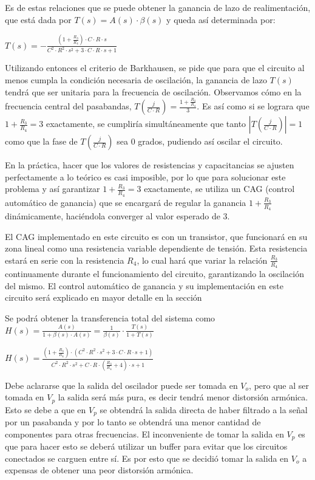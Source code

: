 \documentclass[../../tc_tp6_main.tex]{subfiles}
\begin{document}
	 Es de estas relaciones que se puede obtener la ganancia de lazo de realimentación, que está dada por $T(s) = A(s)\cdot \beta(s)$ y queda así determinada por: \par
	 \begin{center}
	 $T(s) =-\frac{(1+\frac{R_3}{R_4} )\cdot C\cdot R \cdot s}{C^2\cdot R^2 \cdot s^2 + 3\cdot C\cdot R\cdot s +1}$ 
	\end{center}
	Utilizando entonces el criterio de Barkhausen, se pide que para que el circuito al menos cumpla la condición necesaria de oscilación, la ganancia de lazo $T(s)$ tendrá que ser unitaria para la frecuencia de oscilación. Observamos cómo en la frecuencia central del pasabandas, $T(\frac{j}{C\cdot R}) = \frac{1+\frac{R_3}{R_4}}{3}$. Es así como si se lograra que $1+\frac{R_3}{R_4} = 3$ exactamente, se cumpliría simultáneamente que tanto $|T(\frac{j}{C\cdot R})| = 1$ como que la fase de $T(\frac{j}{C\cdot R})$ sea 0 grados, pudiendo así oscilar el circuito. \par
	En la práctica, hacer que los valores de resistencias y capacitancias se ajusten perfectamente a lo teórico es casi imposible, por lo que para solucionar este problema y así garantizar $1+\frac{R_3}{R_4} = 3$ exactamente, se utiliza un CAG (control automático de ganancia) que se encargará de regular la ganancia $1+\frac{R_3}{R_4}$ dinámicamente, haciéndola converger al valor esperado de 3. \par
	El CAG implementado en este circuito es con un transistor, que funcionará en su zona lineal como una resistencia variable dependiente de tensión. Esta resistencia estará en serie con la resistencia $R_4$, lo cual hará que variar la relación $\frac{R_3}{R_4}$ continuamente durante el funcionamiento del circuito, garantizando la oscilación del mismo. El control automático de ganancia y su implementación en este circuito será explicado en mayor detalle en la sección \par
	Se podrá obtener la transferencia total del sistema como $H(s) = \frac{A(s)}{1 + \beta (s) \cdot A(s)} = \frac{1}{\beta (s)} \cdot \frac{T(s)}{1+T(s)}$ \par
	
	\begin{center}
	$H(s) = \frac{(1+\frac{R_3}{R_4})\cdot (C^2\cdot R^2 \cdot s^2 + 3\cdot C\cdot R \cdot s+1)}{C^2\cdot R^2 \cdot s^2 + C\cdot R \cdot (\frac{R_3}{R_4}+4) \cdot s +1}$
	\end{center}
	
	Debe aclararse que la salida del oscilador puede ser tomada en $V_o$, pero que al ser tomada en $V_p$ la salida será más pura, es decir tendrá menor distorsión armónica. Esto se debe a que en $V_p$ se obtendrá la salida directa de haber filtrado a la señal por un pasabanda y por lo tanto se obtendrá una menor cantidad de componentes para otras frecuencias. El inconveniente de tomar la salida en $V_p$ es que para hacer esto se deberá utilizar un buffer para evitar que los circuitos conectados se carguen entre sí. Es por esto que se decidió tomar la salida en $V_o$ a expensas de obtener una peor distorsión armónica.
	
\end{document}
